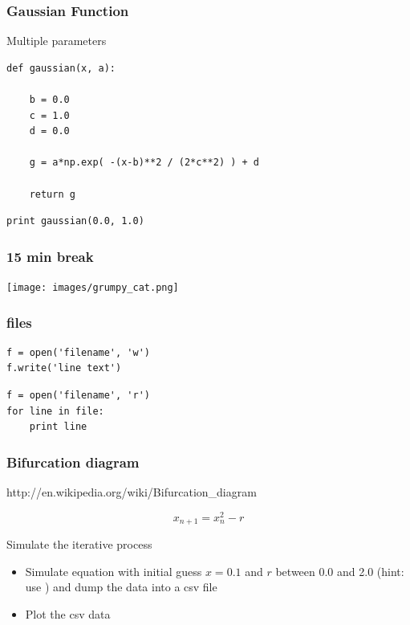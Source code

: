 \begin{frame}[fragile]

    \frametitle{Gaussian Function}

    Multiple parameters

    \bigskip

\begin{lstlisting}
def gaussian(x, a):

    b = 0.0
    c = 1.0
    d = 0.0

    g = a*np.exp( -(x-b)**2 / (2*c**2) ) + d

    return g
\end{lstlisting}

\begin{lstlisting}
print gaussian(0.0, 1.0)
\end{lstlisting}

\end{frame}

\begin{frame}[fragile]
    \frametitle{15 min break}
    \begin{center}
        \texttt{[image: images/grumpy\_cat.png]}
    \end{center}
\end{frame}


\begin{frame}[fragile]

    \frametitle{files}

\begin{lstlisting}
f = open('filename', 'w')
f.write('line text')
\end{lstlisting}

\begin{lstlisting}
f = open('filename', 'r')
for line in file:
    print line
\end{lstlisting}

\end{frame}


\begin{frame}[fragile]

    \frametitle{Bifurcation diagram}

    http://en.wikipedia.org/wiki/Bifurcation\_diagram

    \bigskip

    \begin{equation*}
        x_{n+1} = x_n^2 - r
    \end{equation*}

    \bigskip

    Simulate the iterative process

    \begin{itemize}

        \item Simulate equation with initial guess $x=0.1$ and $r$ between 0.0 and 2.0 (hint: use ) and dump the data into a csv file
        \item Plot the csv data

    \end{itemize}

\end{frame}



